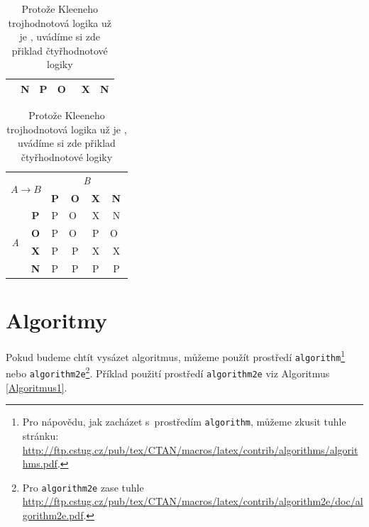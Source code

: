 \documentclass[a4paper, 11pt]{article}
\begin{document}
\begin{table}[ht]
\begin{center}
\begin{tabular}{|c|c|c|c|c|c|}
                                      & \textbf{N}        & P          & O~& X          & N          \\ \hline
        \end{tabular}
        \begin{tabular}{|c|c|c|c|c|c|}
            \hline
            \multicolumn{2}{|c|}{\multirow{2}{*}{$A \rightarrow B$}} & \multicolumn{4}{c|}{\emph{B}}          \\ \cline{3-6}
            \multicolumn{2}{|c|}{}                        & \textbf{P} & \textbf{O} & \textbf{X} & \textbf{N} \\ \hline
            \multirow{4}{*}{\emph{A}} & \textbf{P}        & P          & O~& X          & N          \\ \cline{2-6}
                                      & \textbf{O}        & P          & O~& P          & O~\\ \cline{2-6}
                                      & \textbf{X}        & P          & P          & X          & X          \\ \cline{2-6}
                                      & \textbf{N}        & P          & P          & P          & P          \\ \hline
        \end{tabular}
        \label{TabulkaLogiky}
        \caption{Protože Kleeneho trojhodnotová logika už je , uvádíme si zde přiklad čtyřhodnotové logiky}\label{tab2}
    \end{center}
\end{table}
\shorthandon{-}

\section{Algoritmy}\label{sekce3}

Pokud budeme chtít vysázet algoritmus, můžeme použít prostředí \texttt{algorithm}\footnote{Pro nápovědu, jak zacházet s~prostředím \texttt{algorithm}, můžeme zkusit tuhle stránku:\\
\href{http://ftp.cstug.cz/pub/tex/CTAN/macros/latex/contrib/algorithms/algorithms.pdf}
{http://ftp.cstug.cz/pub/tex/CTAN/macros/latex/contrib/algorithms/algorithms.pdf}.} nebo \texttt{algorithm2e}\footnote{Pro \texttt{algorithm2e} zase tuhle \href{http://ftp.cstug.cz/pub/tex/CTAN/macros/latex/contrib/algorithm2e/doc/algorithm2e.pdf}{http://ftp.cstug.cz/pub/tex/CTAN/macros/latex/contrib/algorithm2e/doc/algorithm2e.pdf}.}. Příklad použití prostředí \texttt{algorithm2e} viz Algoritmus \ref{Algoritmus1}.
\end{document}
